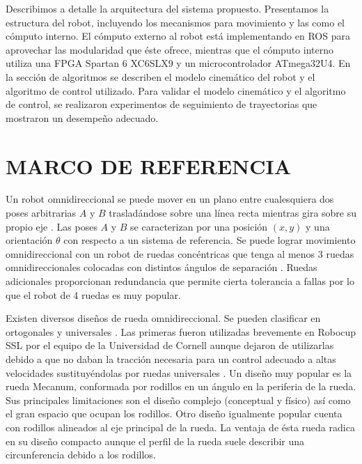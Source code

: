 \documentclass[twocolumn,10pt]{amrob}
\newcommand{\TODO}[1]{{\color{red}{TODO: {#1}}}}
\begin{document}
Describimos a detalle la arquitectura del sistema propuesto. Presentamos la estructura del robot, incluyendo los mecanismos para movimiento y las como el cómputo interno. El cómputo externo al robot está implementando en ROS para aprovechar las modularidad que éste ofrece, mientras que el cómputo interno utiliza una FPGA Spartan 6 XC6SLX9 y un microcontrolador ATmega32U4. En la sección de algoritmos se describen el modelo cinemático del robot y el algoritmo de control utilizado. Para validar el modelo cinemático y el algoritmo de control, se realizaron experimentos de seguimiento de trayectorias que mostraron un desempeño adecuado.


\section*{MARCO DE REFERENCIA}

Un robot omnidireccional se puede mover en un plano entre cualesquiera dos poses arbitrarias $A$ y $B$ trasladándose sobre una línea recta mientras gira sobre su propio eje \cite{rojas2005short}. Las poses $A$ y $B$ se caracterizan por una posición $(x,y)$ y una orientación $\theta$ con respecto a un sistema de referencia. Se puede lograr movimiento omnidireccional con un robot de ruedas concéntricas que tenga al menos 3 ruedas omnidireccionales colocadas con distintos ángulos de separación \cite{rojas2006holonomic}. Ruedas adicionales proporcionan redundancia que permite cierta tolerancia a fallas por lo que el robot de 4 ruedas es muy popular.

Existen diversos diseños de rueda omnidireccional. Se pueden clasificar en ortogonales y universales \cite{ashmore2002omni}. Las primeras fueron utilizadas brevemente en Robocup SSL por el equipo de la Universidad de Cornell \cite{d2000cornell} aunque dejaron de utilizarlas debido a que no daban la tracción necesaria para un control adecuado a altas velocidades sustituyéndolas por ruedas universales \cite{purwin2003cornell}. Un diseño muy popular es la rueda Mecanum, conformada por rodillos en un ángulo en la periferia de la rueda. Sus principales limitaciones son el diseño complejo (conceptual y físico) así como el gran espacio que ocupan los rodillos. Otro diseño igualmente popular cuenta con rodillos alineados al eje principal de la rueda. La ventaja de ésta rueda radica en su diseño compacto aunque el perfil de la rueda suele describir una circunferencia debido a los rodillos. 
\end{document}
